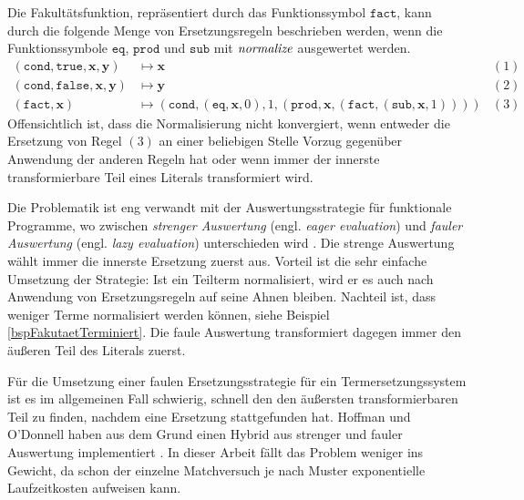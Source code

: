 \begin{beispiel} \label{bspFakutaetTerminiert}
Die Fakultätsfunktion, repräsentiert durch das Funktionssymbol $\texttt{fact}$, kann durch die folgende Menge von Ersetzungsregeln beschrieben werden, wenn die Funktionssymbole $\texttt{eq}$, $\texttt{prod}$ und $\texttt{sub}$ mit $\mathit{normalize}$ ausgewertet werden. 
\begin{align*}
    (\texttt{cond}, \texttt{true}, \mathbf x, \mathbf y) 
    &\mapsto \mathbf x 
    &(1)\\        
    (\texttt{cond}, \texttt{false}, \mathbf x, \mathbf y) 
    &\mapsto \mathbf y 
    &(2)\\        
    (\texttt{fact}, \mathbf x) 
    &\mapsto (\texttt{cond}, (\texttt{eq}, \mathbf x, 0), 1, (\texttt{prod}, \mathbf x, (\texttt{fact}, (\texttt{sub}, \mathbf x, 1)))) 
    &(3)
\end{align*}
Offensichtlich ist, dass die Normalisierung nicht konvergiert, wenn entweder die Ersetzung von Regel $(3)$ an einer beliebigen Stelle Vorzug gegenüber Anwendung der anderen Regeln hat oder wenn immer der innerste transformierbare Teil eines Literals transformiert wird.
\end{beispiel}

Die Problematik ist eng verwandt mit der Auswertungsstrategie für funktionale Programme, wo zwischen \textit{strenger Auswertung} (engl. \textit{eager evaluation}) und \textit{fauler Auswertung} (engl. \textit{lazy evaluation}) unterschieden wird  \cite{EvalStrategien}. Die strenge Auswertung wählt immer die innerste Ersetzung zuerst aus. Vorteil ist die sehr einfache Umsetzung der Strategie: Ist ein Teilterm normalisiert, wird er es auch nach Anwendung von Ersetzungsregeln auf seine Ahnen bleiben. Nachteil ist, dass weniger Terme normalisiert werden können, siehe Beispiel \ref{bspFakutaetTerminiert}. Die faule Auswertung transformiert dagegen immer den äußeren Teil des Literals zuerst. 

Für die Umsetzung einer faulen Ersetzungsstrategie für ein Termersetzungssystem ist es im allgemeinen Fall schwierig, schnell den den äußersten transformierbaren Teil zu finden, nachdem eine Ersetzung stattgefunden hat. Hoffman und O'Donnell haben aus dem Grund einen Hybrid aus strenger und fauler Auswertung implementiert \cite{hoffmann1982programming}.
 In dieser Arbeit fällt das Problem weniger ins Gewicht, da schon der einzelne Matchversuch je nach Muster exponentielle Laufzeitkosten aufweisen kann.








